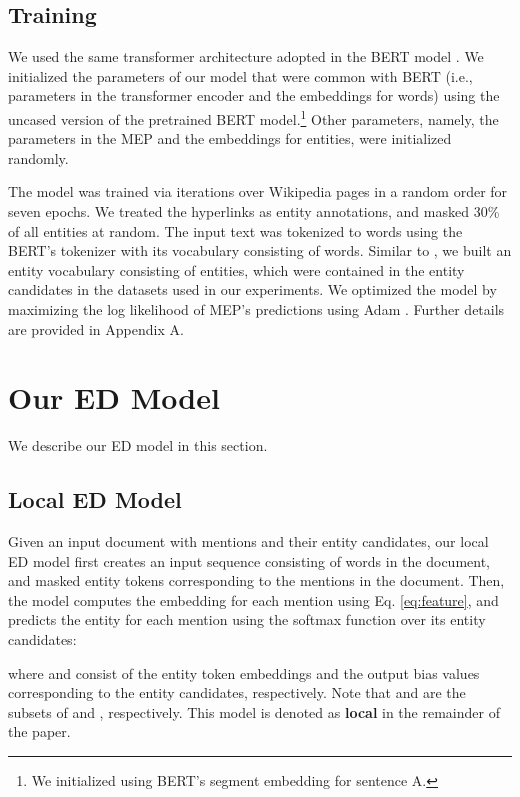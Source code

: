 \documentclass[11pt,a4paper]{article}
\begin{document}
\subsection{Training}
\label{subsec:training}
We used the same transformer architecture adopted in the BERT model \cite{devlin2018bert}.
We initialized the parameters of our model that were common with BERT (i.e., parameters in the transformer encoder and the embeddings for words) using the uncased version of the pretrained BERT model.\footnote{We initialized  using BERT's segment embedding for sentence A.}
Other parameters, namely, the parameters in the MEP and the embeddings for entities, were initialized randomly.

The model was trained via iterations over Wikipedia pages in a random order for seven epochs.
We treated the hyperlinks as entity annotations, and masked 30\% of all entities at random.
The input text was tokenized to words using the BERT's tokenizer with its vocabulary consisting of  words.
Similar to , we built an entity vocabulary consisting of  entities, which were contained in the entity candidates in the datasets used in our experiments.
We optimized the model by maximizing the log likelihood of MEP's predictions using Adam \cite{kingma2014adam}.
Further details are provided in Appendix A.

\section{Our ED Model}
We describe our ED model in this section.

\subsection{Local ED Model}
Given an input document with  mentions and their  entity candidates, our local ED model first creates an input sequence consisting of words in the document, and  masked entity tokens corresponding to the mentions in the document.
Then, the model computes the embedding  for each mention using Eq. \eqref{eq:feature}, and predicts the entity for each mention using the softmax function over its  entity candidates:

where  and  consist of the entity token embeddings and the output bias values corresponding to the entity candidates, respectively.
Note that  and  are the subsets of  and , respectively.
This model is denoted as \textbf{local} in the remainder of the paper.
\end{document}
